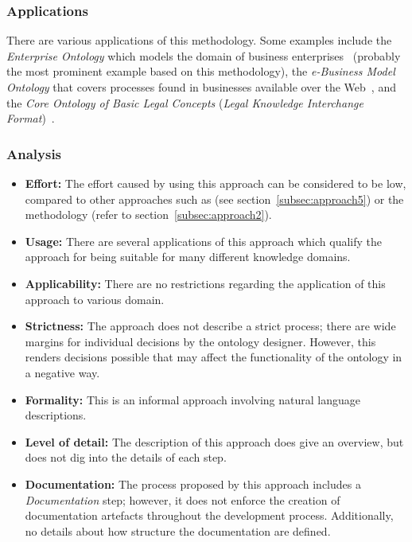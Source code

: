 \subsubsection{Applications}

There are various applications of this methodology. Some examples include the \emph{Enterprise Ontology} which models the domain of business enterprises~\cite{uschold_example1} (probably the most prominent example based on this methodology), the \emph{e-Business Model Ontology} that covers processes found in businesses available over the Web~\cite{uschold_example2}, and the \emph{ Core Ontology of Basic Legal Concepts} (\emph{Legal Knowledge Interchange Format})~\cite{uschold_example3}.

\subsubsection{Analysis}

\begin{itemize}
  \item \textbf{Effort:} The effort caused by using this approach can be considered to be low, compared to other approaches such as \methontology (see section~\ref{subsec:approach5}) or the  methodology (refer to section~\ref{subsec:approach2}).
  
   \item \textbf{Usage:} There are several applications of this approach which qualify the approach for being suitable for many different knowledge domains.
  
  \item \textbf{Applicability:} There are no restrictions regarding the application of this approach to various domain.
  
  \item \textbf{Strictness:} The approach does not describe a strict process; there are wide margins for individual decisions by the ontology designer. However, this renders decisions possible that may affect the functionality of the ontology in a negative way.
  
  \item \textbf{Formality:} This is an informal approach involving natural language descriptions.
  
  \item \textbf{Level of detail:} The description of this approach does give an overview, but does not dig into the details of each step.
  
  \item \textbf{Documentation:} The process proposed by this approach includes a \emph{Documentation} step; however, it does not enforce the creation of documentation artefacts throughout the development process. Additionally, no details about how structure the documentation are defined.
\end{itemize}

